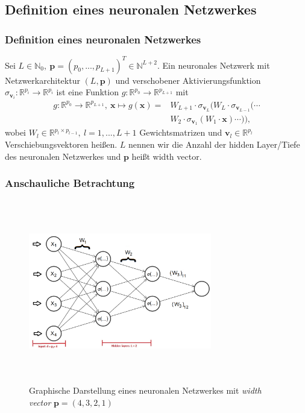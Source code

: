 \documentclass[hyperref={pdfpagelabels=false}]{beamer}
\begin{document}
\subsection{Definition eines neuronalen Netzwerkes}
\begin{frame}
\frametitle{Definition eines neuronalen Netzwerkes}
\begin{def2} 
 Sei $L \in \mathbb{N}_0, \ \mathbf{p}=(p_0,...,p_{L+1})^T \in \mathbb{N}^{L+2}.$
Ein neuronales Netzwerk mit Netzwerkarchitektur $(L,\mathbf{p})$ und verschobener Aktivierungsfunktion $\sigma _{\textbf{v}_{i}}: \mathbb{R}^{p_i} \rightarrow \mathbb{R}^{p_i} $ ist eine Funktion $g: \mathbb{R}^{p_0} \rightarrow \mathbb{R}^{p_{L+1}}$ mit 
\begin{equation} \label{eq:1}
\begin{aligned} 
g: \mathbb{R}^{p_0} \rightarrow \mathbb{R}^{p_{L+1}}, \ \mathbf{x} \mapsto g(\mathbf{x})= &W_{L+1} \cdot \sigma_{ \textbf{v}_L} (W_{L} \cdot \sigma _{\textbf{v}_{L-1}}( \cdots  \\&W_2 \cdot \sigma _{\textbf{v}_1} (W_1 \cdot \mathbf{x}) \cdots )),
\end{aligned}
\end{equation}
wobei $W_{l} \in \mathbb{R}^{	p_l \times p_{l-1}}, \ l = 1,...,L+1 $ Gewichtsmatrizen und $\mathbf{v}_{l} \in \mathbb{R}^{p_l}$ Verschiebungsvektoren heißen. $L$ nennen wir die Anzahl der hidden Layer/Tiefe des neuronalen Netzwerkes und $\mathbf{p}$ heißt width vector. 
\end{def2} 
\end{frame}

\begin{frame}
\frametitle{Anschauliche Betrachtung}
\begin{figure}[h]
	\centering
	\includegraphics[width=8cm,height=8cm,keepaspectratio]{Bilder/NNGraphmitPfeilen1.png}
	\caption{Graphische Darstellung eines neuronalen Netzwerkes mit \textit{width vector} $\mathbf{p}=(4,3,2,1)$}
	\label{ungerichteterGraph}
\end{figure}
\end{frame}
\end{document}
